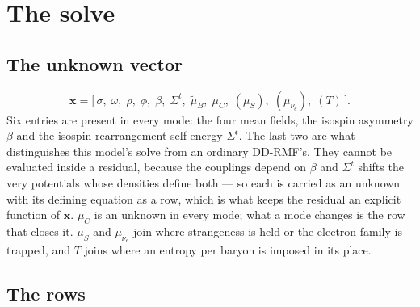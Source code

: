 \documentclass[aps,prc,onecolumn,superscriptaddress,nofootinbib,10pt]{revtex4-2}
\newcommand{\muC}{\mu_C}
\newcommand{\muS}{\mu_S}
\newcommand{\munue}{\mu_{\nu_e}}
\newcommand{\mutB}{\tilde{\mu}_B}
\newcommand{\Sigmat}{\Sigma^{t}}
\begin{document}
\section{The solve}
\label{sec:modes}

\subsection{The unknown vector}

\begin{equation}
  \mathbf{x} = \big[\, \sigma,\; \omega,\; \rho,\; \phi,\;
                       \beta,\; \Sigmat,\; \mutB,\; \muC,\;
                       (\muS),\; (\munue),\; (T) \,\big] .
  \label{eq:unknowns}
\end{equation}
Six entries are present in every mode: the four mean fields, the isospin
asymmetry $\beta$ and the isospin rearrangement self-energy $\Sigmat$. The last
two are what distinguishes this model's solve from an ordinary DD-RMF's. They
cannot be evaluated inside a residual, because the couplings depend on $\beta$
and $\Sigmat$ shifts the very potentials whose densities define both --- so
each is carried as an unknown with its defining equation as a row, which is
what keeps the residual an explicit function of $\mathbf{x}$. $\muC$ is an
unknown in every mode; what a mode changes is the row that closes it. $\muS$
and $\munue$ join where strangeness is held or the electron family is trapped,
and $T$ joins where an entropy per baryon is imposed in its place.

\subsection{The rows}
\end{document}
